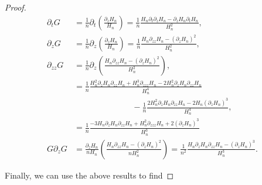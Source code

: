\begin{proof}
    \begin{align*}
        \partial_t G &= \frac1n\partial_t \left( \frac{\partial_z H_n}{H_n} \right) = \frac1n\frac{ H_n \partial_t \partial_z H_n - \partial_z H_n \partial_t H_n }{H_n^2},\\ 
        \partial_z G &= \frac1n\partial_z \left( \frac{\partial_z H_n}{H_n} \right) = \frac1n\frac{H_n \partial_{zz}H_n - (\partial_z H_n)^2}{H_n^2},\\ 
        \partial_{zz} G &= \frac1n\partial_z \left( \frac{H_n \partial_{zz}H_n - (\partial_z H_n)^2}{H_n^2} \right), \\ 
        &= \frac1n \frac{ H_n^2\partial_z H_n \partial_{zz}H_n + H_n^3\partial_{zzz}H_n - 2H_n^2\partial_z H_n \partial_{zz}H_n }{H_n^4} \\
        & \phantom{separadoasídem}-\frac1n\frac{2H_n^2\partial_z H_n \partial_{zz}H_n - 2 H_n (\partial_z H_n)^3}{H_n^4},\\
        &= \frac1n\frac{-3H_n\partial_z H_n \partial_{zz}H_n + H_n^2 \partial_{zzz}H_n + 2(\partial_z H_n)^3}{H_n^3} \\
        G\partial_z G &= \frac{\partial_z H_n}{nH_n}\left( \frac{H_n \partial_{zz}H_n - (\partial_z H_n)^2}{nH_n^2}  \right) = \frac{1}{n^2}\frac{H_n\partial_z H_n \partial_{zz}H_n - (\partial_z H_n)^3}{H_n^3}.
    \end{align*}

    Finally, we can use the above results to find


\end{proof}
